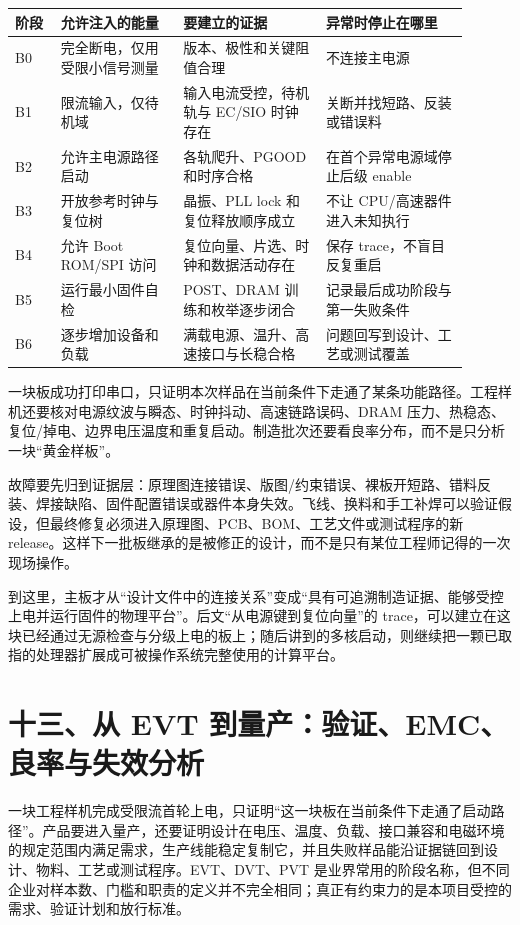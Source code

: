 \begin{longtable}{L{0.09\linewidth}L{0.24\linewidth}L{0.29\linewidth}L{0.28\linewidth}}
\toprule
阶段 & 允许注入的能量 & 要建立的证据 & 异常时停止在哪里 \\
\midrule
B0 & 完全断电，仅用受限小信号测量 & 版本、极性和关键阻值合理 & 不连接主电源 \\\tablerowrule
B1 & 限流输入，仅待机域 & 输入电流受控，待机轨与 EC/SIO 时钟存在 & 关断并找短路、反装或错误料 \\\tablerowrule
B2 & 允许主电源路径启动 & 各轨爬升、PGOOD 和时序合格 & 在首个异常电源域停止后级 enable \\\tablerowrule
B3 & 开放参考时钟与复位树 & 晶振、PLL lock 和复位释放顺序成立 & 不让 CPU/高速器件进入未知执行 \\\tablerowrule
B4 & 允许 Boot ROM/SPI 访问 & 复位向量、片选、时钟和数据活动存在 & 保存 trace，不盲目反复重启 \\\tablerowrule
B5 & 运行最小固件自检 & POST、DRAM 训练和枚举逐步闭合 & 记录最后成功阶段与第一失败条件 \\\tablerowrule
B6 & 逐步增加设备和负载 & 满载电源、温升、高速接口与长稳合格 & 问题回写到设计、工艺或测试覆盖 \\
\bottomrule
\end{longtable}


一块板成功打印串口，只证明本次样品在当前条件下走通了某条功能路径。工程样机还要核对电源纹波与瞬态、时钟抖动、高速链路误码、DRAM 压力、热稳态、复位/掉电、边界电压温度和重复启动。制造批次还要看良率分布，而不是只分析一块“黄金样板”。

故障要先归到证据层：原理图连接错误、版图/约束错误、裸板开短路、错料反装、焊接缺陷、固件配置错误或器件本身失效。飞线、换料和手工补焊可以验证假设，但最终修复必须进入原理图、PCB、BOM、工艺文件或测试程序的新 release。这样下一批板继承的是被修正的设计，而不是只有某位工程师记得的一次现场操作。

到这里，主板才从“设计文件中的连接关系”变成“具有可追溯制造证据、能够受控上电并运行固件的物理平台”。后文“从电源键到复位向量”的 trace，可以建立在这块已经通过无源检查与分级上电的板上；随后讲到的多核启动，则继续把一颗已取指的处理器扩展成可被操作系统完整使用的计算平台。
\section{十三、从 EVT 到量产：验证、EMC、良率与失效分析}

一块工程样机完成受限流首轮上电，只证明“这一块板在当前条件下走通了启动路径”。产品要进入量产，还要证明设计在电压、温度、负载、接口兼容和电磁环境的规定范围内满足需求，生产线能稳定复制它，并且失败样品能沿证据链回到设计、物料、工艺或测试程序。EVT、DVT、PVT 是业界常用的阶段名称，但不同企业对样本数、门槛和职责的定义并不完全相同；真正有约束力的是本项目受控的需求、验证计划和放行标准。


